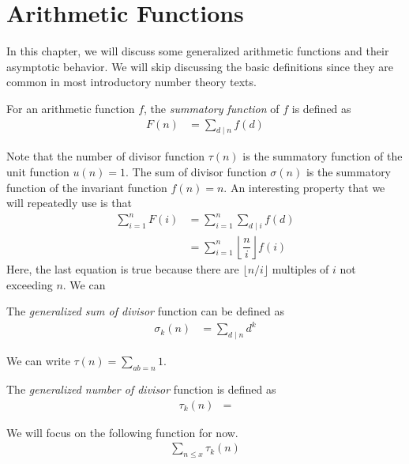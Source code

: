 \documentclass[elemannt.tex]{subfile}
\begin{document}
	\chapter{Arithmetic Functions}
	In this chapter, we will discuss some generalized arithmetic functions and their asymptotic behavior. We will skip discussing the basic definitions since they are common in most introductory number theory texts.
		\begin{definition}
			For an arithmetic function $f$, the \textit{summatory function} of $f$ is defined as
				\begin{align*}
					F(n)
						& = \sum_{d\mid n}f(d)
				\end{align*}
		\end{definition}
	Note that the number of divisor function $\tau(n)$ is the summatory function of the unit function $u(n)=1$. The sum of divisor function $\sigma(n)$ is the summatory function of the invariant function $f(n)=n$. An interesting property that we will repeatedly use is that
		\begin{align*}
			\sum_{i=1}^{n}F(i)
				& = \sum_{i=1}^{n}\sum_{d\mid i}f(d)\\
				& = \sum_{i=1}^{n}\left\lfloor{\dfrac{n}{i}}\right\rfloor f(i)
		\end{align*}
	Here, the last equation is true because there are $\lfloor{n/i}\rfloor$ multiples of $i$ not exceeding $n$. We can 
		\begin{definition}
			The \textit{generalized sum of divisor} function can be defined as
				\begin{align*}
					\sigma_{k}(n)
					& = \sum_{d\mid n}d^{k}
			\end{align*}
		\end{definition}
	We can write $\tau(n)=\sum_{ab=n}1$.
		\begin{definition}
			The \textit{generalized number of divisor} function is defined as
				\begin{align*}
					\tau_{k}(n)
						& = 
				\end{align*}
		\end{definition}
	We will focus on the following function for now.
		\begin{align*}
			\sum_{n\leq x}\tau_{k}(n)
		\end{align*}
\end{document}
